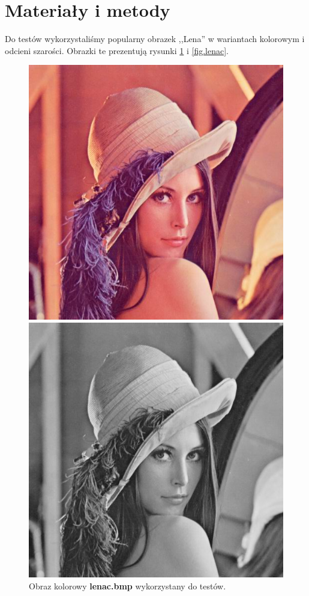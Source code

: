 \documentclass{classrep}
\begin{document}
\section{Materiały i metody}
Do testów wykorzystaliśmy popularny obrazek ,,Lena'' w wariantach kolorowym i odcieni szarości. Obrazki te prezentują rysunki \ref{fig.lena} i \ref{fig.lenac}.

\begin{figure}
  \begin{minipage}{0.5\linewidth}
    \centering
    \includegraphics[scale=0.4]{img/lenac.png}
    \caption{Obraz kolorowy \textbf{lenac.bmp} wykorzystany do testów.}
    \label{fig.lena}
  \end{minipage}
  \hspace{0.5cm}
  \begin{minipage}{0.5\linewidth}
    \centering
    \includegraphics[scale=0.4]{img/lena.png}

\end{minipage}
\end{figure}
\end{document}
